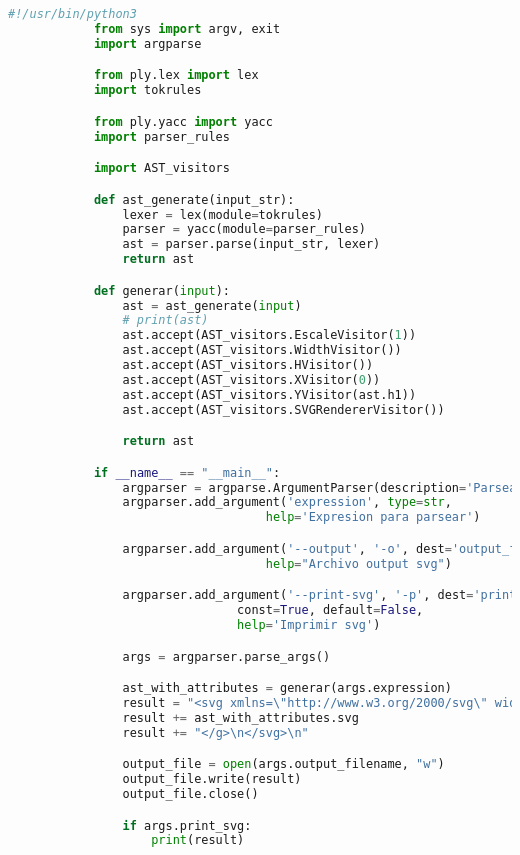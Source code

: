         \begin{lstlisting}[language=Python]
            #!/usr/bin/python3
            from sys import argv, exit
            import argparse

            from ply.lex import lex
            import tokrules

            from ply.yacc import yacc
            import parser_rules

            import AST_visitors

            def ast_generate(input_str):
                lexer = lex(module=tokrules)
                parser = yacc(module=parser_rules)
                ast = parser.parse(input_str, lexer)
                return ast

            def generar(input):
                ast = ast_generate(input)
                # print(ast)
                ast.accept(AST_visitors.EscaleVisitor(1))
                ast.accept(AST_visitors.WidthVisitor())
                ast.accept(AST_visitors.HVisitor())
                ast.accept(AST_visitors.XVisitor(0))
                ast.accept(AST_visitors.YVisitor(ast.h1))
                ast.accept(AST_visitors.SVGRendererVisitor())

                return ast

            if __name__ == "__main__":
                argparser = argparse.ArgumentParser(description='Parsea y genera SVG. Lo podes mandar a un archivo')
                argparser.add_argument('expression', type=str,
                                    help='Expresion para parsear')

                argparser.add_argument('--output', '-o', dest='output_filename', default='output.svg', type=str,
                                    help="Archivo output svg")

                argparser.add_argument('--print-svg', '-p', dest='print_svg', action='store_const',
                                const=True, default=False,
                                help='Imprimir svg')

                args = argparser.parse_args()

                ast_with_attributes = generar(args.expression)
                result = "<svg xmlns=\"http://www.w3.org/2000/svg\" width=\"{}\" height=\"{}\" version=\"1.1\" style=\"background: white\">\n<g transform=\"scale(40) translate(1,1)\" font-family=\"Courier\">\n".format(ast_with_attributes.a*50+80, (ast_with_attributes.h1+ast_with_attributes.h2)*40+80, ast_with_attributes.h1)
                result += ast_with_attributes.svg
                result += "</g>\n</svg>\n"

                output_file = open(args.output_filename, "w")
                output_file.write(result)
                output_file.close()

                if args.print_svg:
                    print(result)

        \end{lstlisting}
